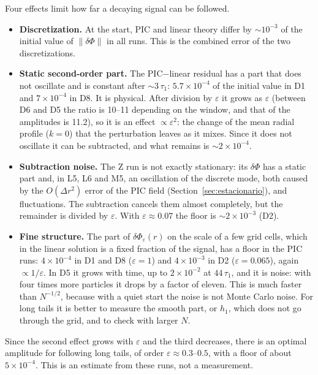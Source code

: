 \documentclass[11pt,a4paper]{article}
\begin{document}
Four effects limit how far a decaying signal can be followed.
\begin{itemize}
\item \textbf{Discretization.} At the start, PIC and linear theory differ by $\sim10^{-3}$ of
the initial value of $\|\delta\Phi\|$ in all runs. This is the combined error of the two
discretizations.
\item \textbf{Static second-order part.} The PIC$-$linear residual has a part that does not
oscillate and is constant after $\sim3\,\tau_1$: $5.7\times10^{-4}$ of the initial value in D1
and $7\times10^{-4}$ in D8. It is physical. After division by $\varepsilon$ it grows as
$\varepsilon$ (between D6 and D5 the ratio is 10--11 depending on the window, and that of the
amplitudes is 11.2), so it is an effect $\propto\varepsilon^2$: the change of the mean radial
profile ($k=0$) that the perturbation leaves as it mixes. Since it does not oscillate it
can be subtracted, and what remains is $\sim2\times10^{-4}$.
\item \textbf{Subtraction noise.} The Z run is not exactly stationary: its $\delta\Phi$ has a
static part and, in L5, L6 and M5, an oscillation of the discrete mode, both caused by the
$O(\Delta r^2)$ error of the PIC field (Section~\ref{sec:estacionario}), and fluctuations. The
subtraction cancels them almost completely, but the remainder is divided by $\varepsilon$.
With $\varepsilon\approx0.07$ the floor is $\sim2\times10^{-3}$ (D2).
\item \textbf{Fine structure.} The part of $\delta\Phi_\varepsilon(r)$ on the scale of a few grid
cells, which in the linear solution is a fixed fraction of the signal, has a floor in the
PIC runs: $4\times10^{-4}$ in D1 and D8 ($\varepsilon=1$) and $4\times10^{-3}$ in D2
($\varepsilon=0.065$), again $\propto1/\varepsilon$. In D5 it grows with time, up to
$2\times10^{-2}$ at $44\,\tau_1$, and it is noise: with four times more particles it drops by a
factor of eleven. This is much faster than $N^{-1/2}$, because with a quiet start the noise
is not Monte Carlo noise. For long tails it is better to measure the smooth part, or
$h_1$, which does not go through the grid, and to check with larger $N$.
\end{itemize}
Since the second effect grows with $\varepsilon$ and the third decreases, there is an
optimal amplitude for following long tails, of order $\varepsilon\approx0.3$--$0.5$, with a
floor of about $5\times10^{-4}$. This is an estimate from these runs, not a measurement.
\end{document}
